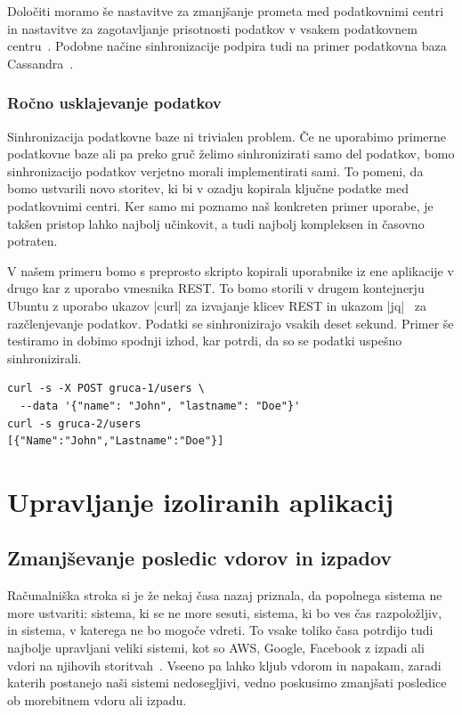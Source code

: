 \documentclass[a4paper, 12pt]{book}
\begin{document}
Določiti moramo še nastavitve za zmanjšanje prometa med podatkovnimi centri in nastavitve za zagotavljanje prisotnosti podatkov v vsakem podatkovnem centru~\cite{cratedb-zone}.
Podobne načine sinhronizacije podpira tudi na primer podatkovna baza Cassandra~\cite{cassandra-zone}.
\subsection{Ročno usklajevanje podatkov}
Sinhronizacija podatkovne baze ni trivialen problem.
Če ne uporabimo primerne podatkovne baze ali pa preko gruč želimo sinhronizirati samo del podatkov, bomo sinhronizacijo podatkov verjetno morali implementirati sami.
To pomeni, da bomo ustvarili novo storitev, ki bi v ozadju kopirala ključne podatke med podatkovnimi centri.
Ker samo mi poznamo naš konkreten primer uporabe, je takšen pristop lahko najbolj učinkovit, a tudi najbolj kompleksen in časovno potraten.

V našem primeru bomo s preprosto skripto kopirali uporabnike iz ene aplikacije v drugo kar z uporabo vmesnika REST.
To bomo storili v drugem kontejnerju Ubuntu z uporabo ukazov \spverb|curl| za izvajanje klicev REST in ukazom \spverb|jq|~\cite{jq} za razčlenjevanje podatkov.
Podatki se sinhronizirajo vsakih deset sekund.
Primer še testiramo in dobimo spodnji izhod, kar potrdi, da so se podatki uspešno sinhronizirali.
\begin{verbatim}
curl -s -X POST gruca-1/users \
  --data '{"name": "John", "lastname": "Doe"}'
curl -s gruca-2/users
[{"Name":"John","Lastname":"Doe"}]
\end{verbatim}
\chapter{Upravljanje izoliranih aplikacij}
\section{Zmanjševanje posledic vdorov in izpadov}
Računalniška stroka si je že nekaj časa nazaj priznala, da popolnega sistema ne more ustvariti: sistema, ki se ne more sesuti, sistema, ki bo ves čas razpoložljiv, in sistema, v katerega ne bo mogoče vdreti.
To vsake toliko časa potrdijo tudi najbolje upravljani veliki sistemi, kot so AWS, Google, Facebook z izpadi ali vdori na njihovih storitvah~\cite{common-outages}. 
Vseeno pa lahko kljub vdorom in napakam, zaradi katerih postanejo naši sistemi nedosegljivi, vedno poskusimo zmanjšati posledice ob morebitnem vdoru ali izpadu. 
\end{document}
